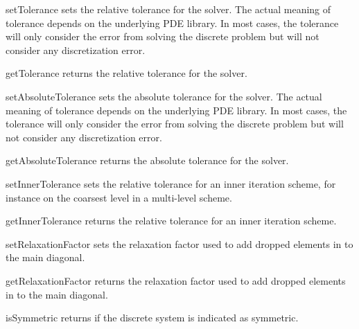 \begin{methoddesc}[SolverOptions]{setTolerance}{}
sets the relative tolerance for the solver. The actual meaning of tolerance
depends on the underlying PDE library. In most cases, the tolerance
will only consider the error from solving the discrete problem but will
not consider any discretization error.
\end{methoddesc}

\begin{methoddesc}[SolverOptions]{getTolerance}{}
returns the relative tolerance for the solver.
\end{methoddesc}

\begin{methoddesc}[SolverOptions]{setAbsoluteTolerance}{}
sets the absolute tolerance for the solver. The actual meaning of tolerance
depends on the underlying PDE library. In most cases, the tolerance
will only consider the error from solving the discrete problem but will
not consider any discretization error.
\end{methoddesc}

\begin{methoddesc}[SolverOptions]{getAbsoluteTolerance}{}
returns the absolute tolerance for the solver.
\end{methoddesc}

\begin{methoddesc}[SolverOptions]{setInnerTolerance}{}
sets the relative tolerance for an inner iteration scheme, for instance
on the coarsest level in a multi-level scheme.
\end{methoddesc}

\begin{methoddesc}[SolverOptions]{getInnerTolerance}{}
returns the relative tolerance for an inner iteration scheme.
\end{methoddesc}


\begin{methoddesc}[SolverOptions]{setRelaxationFactor}{}
sets the relaxation factor used to add dropped elements in \RILU to the main diagonal.
\end{methoddesc}

\begin{methoddesc}[SolverOptions]{getRelaxationFactor}{}
returns the relaxation factor used to add dropped elements in \RILU to the main diagonal.
\end{methoddesc}

\begin{methoddesc}[SolverOptions]{isSymmetric}{}
returns \True if the discrete system is indicated as symmetric.
\end{methoddesc}

